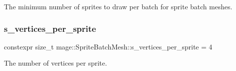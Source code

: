 The minimum number of sprites to draw per batch for sprite batch meshes. \hypertarget{classmage_1_1_sprite_batch_mesh_ac873479f07c19891f7847bed6fc9b862}{}\label{classmage_1_1_sprite_batch_mesh_ac873479f07c19891f7847bed6fc9b862} 
\subsubsection{\texorpdfstring{s\+\_\+vertices\+\_\+per\+\_\+sprite}{s\_vertices\_per\_sprite}}
{\footnotesize\ttfamily constexpr size\+\_\+t mage\+::\+Sprite\+Batch\+Mesh\+::s\+\_\+vertices\+\_\+per\+\_\+sprite = 4\hspace{0.3cm}{\ttfamily [static]}}

The number of vertices per sprite. 